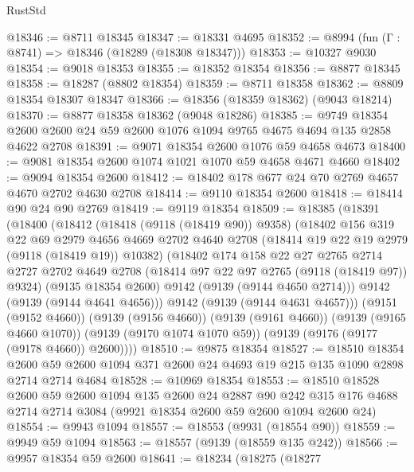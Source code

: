 \begin{lexlean}{RustStd}
\begin{coremodule}
@18346 := @8711 @18345
@18347 := @18331 @4695
@18352 := @8994 (fun (Γ : @8741) => @18346 (@18289 (@18308 @18347)))
@18353 := @10327 @9030
@18354 := @9018 @18353
@18355 := @18352 @18354
@18356 := @8877 @18345
@18358 := @18287 (@8802 @18354)
@18359 := @8711 @18358
@18362 := @8809 @18354 @18307 @18347
@18366 := @18356 (@18359 @18362) (@9043 @18214)
@18370 := @8877 @18358 @18362 (@9048 @18286)
@18385 := @9749
    @18354
    @2600
    @2600
    @24
    @59
    @2600
    @1076
    @1094
    @9765
    @4675
    @4694
    @135
    @2858
    @4622
    @2708
@18391 := @9071 @18354 @2600 @1076 @59 @4658 @4673
@18400 := @9081 @18354 @2600 @1074 @1021 @1070 @59 @4658 @4671 @4660
@18402 := @9094 @18354 @2600
@18412 := @18402 @178 @677 @24 @70 @2769 @4657 @4670 @2702 @4630 @2708
@18414 := @9110 @18354 @2600
@18418 := @18414 @90 @24 @90 @2769
@18419 := @9119 @18354
@18509 := @18385
    (@18391
      (@18400
        (@18412
          (@18418 (@9118 (@18419 @90)) @9358)
          (@18402
            @156
            @319
            @22
            @69
            @2979
            @4656
            @4669
            @2702
            @4640
            @2708
            (@18414 @19 @22 @19 @2979 (@9118 (@18419 @19)) @10382)
            (@18402
              @174
              @158
              @22
              @27
              @2765
              @2714
              @2727
              @2702
              @4649
              @2708
              (@18414 @97 @22 @97 @2765 (@9118 (@18419 @97)) @9324)
              (@9135 @18354 @2600)
              @9142
              (@9139 (@9144 @4650 @2714)))
            @9142
            (@9139 (@9144 @4641 @4656)))
          @9142
          (@9139 (@9144 @4631 @4657)))
        (@9151 (@9152 @4660))
        (@9139 (@9156 @4660))
        (@9139 (@9161 @4660))
        (@9139 (@9165 @4660 @1070))
        (@9139 (@9170 @1074 @1070 @59))
        (@9139 (@9176 (@9177 (@9178 @4660)) @2600))))
@18510 := @9875 @18354
@18527 := @18510
    @18354
    @2600
    @59
    @2600
    @1094
    @371
    @2600
    @24
    @4693
    @19
    @215
    @135
    @1090
    @2898
    @2714
    @2714
    @4684
@18528 := @10969 @18354
@18553 := @18510
    @18528
    @2600
    @59
    @2600
    @1094
    @135
    @2600
    @24
    @2887
    @90
    @242
    @315
    @176
    @4688
    @2714
    @2714
    @3084
    (@9921 @18354 @2600 @59 @2600 @1094 @2600 @24)
@18554 := @9943 @1094
@18557 := @18553 (@9931 (@18554 @90))
@18559 := @9949 @59 @1094
@18563 := @18557 (@9139 (@18559 @135 @242))
@18566 := @9957 @18354 @59 @2600
@18641 := @18234
    (@18275
      (@18277

\end{coremodule}
\end{lexlean}

